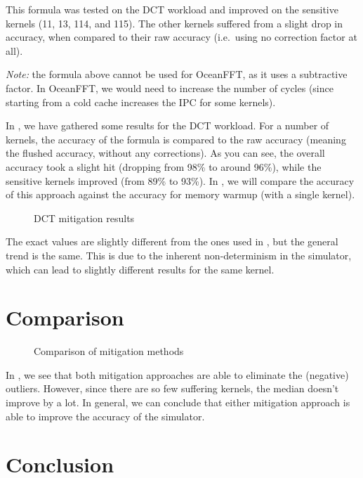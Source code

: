 This formula was tested on the DCT workload and improved on the sensitive kernels (11, 13, 114, and 115).
The other kernels suffered from a slight drop in accuracy, when compared to their raw accuracy (i.e.\ using no correction factor at all).

\textit{Note:} the formula above cannot be used for OceanFFT, as it uses a subtractive factor.
In OceanFFT, we would need to increase the number of cycles (since starting from a cold cache increases the IPC for some kernels).

In , we have gathered some results for the DCT workload.
For a number of kernels, the accuracy of the formula is compared to the raw accuracy (meaning the flushed accuracy, without any corrections).
As you can see, the overall accuracy took a slight hit (dropping from 98\% to around 96\%), while the sensitive kernels improved (from 89\% to 93\%).
In , we will compare the accuracy of this approach against the accuracy for memory warmup (with a single kernel).

\begin{figure}[h]
    \centering
    \caption{DCT mitigation results}
    \label{fig:dct-mitig}
\end{figure}

The exact values are slightly different from the ones used in , but the general trend is the same.
This is due to the inherent non-determinism in the simulator, which can lead to slightly different results for the same kernel.

\FloatBarrier
\section{Comparison}\label{sec:sim-vs-corr}
\begin{figure}[h]
    \centering
    \caption{Comparison of mitigation methods}
    \label{fig:mitig-compare}
\end{figure}

In , we see that both mitigation approaches are able to eliminate the (negative) outliers.
However, since there are so few suffering kernels, the median doesn't improve by a lot.
In general, we can conclude that either mitigation approach is able to improve the accuracy of the simulator.

\FloatBarrier
\section{Conclusion}\label{sec:mitigation-conclusion}

